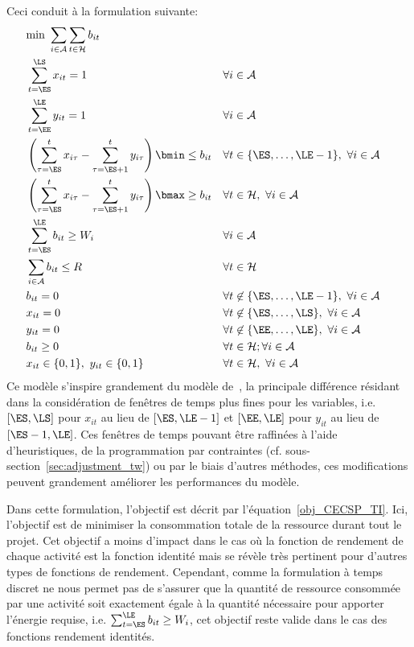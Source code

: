 Ceci conduit à la formulation suivante:
{\small
 \begin{align} &\text{min }
\sum_{i\in \A}\sum_{t \in \H} b_{it}
\label{obj_CECSP_TI}\\ &\sum_{t=\ES}^{\LS} x_{it} = 1 & &\forall i
\in \A \label{start_CECSP_TI}\\ &\sum_{t=\EE}^{\LE} y_{it} =
1 & & \forall i \in \A
\label{end_CECSP_TI}\\&\left(\sum_{\tau=\ES}^{t} x_{i\tau}
-\sum_{\tau=\ES+1}^{t} y_{i\tau}\right)\bmin \le b_{it} & &
\forall t \in \{\ES,\dots,\LE-1\},\ \forall i \in \A
\label{bmin_CECSP_TI}\\ &\left(\sum_{\tau=\ES}^{t} x_{i\tau} -
\sum_{\tau=\ES+1}^{t} y_{i\tau}\right)\bmax\ge b_{it}& & \forall t
\in \H ,\ \forall i \in \A \label{bmax_CECSP_TI}\\
&\sum_{t=\ES}^{\LE} b_{it} \ge W_i & & \forall i \in \A
\label{nrj_CECSP_TI}\\ &\sum_{i \in \A} b_{it} \le R & &
\forall t \in \H \label{res_CECSP_TI}\\ &b_{it} = 0 & &
\forall t \not\in \{\ES,\dots,\LE-1\},\ \forall i \in \A
\label{consNul_CECSP_TI}\\ &x_{it} = 0 & & \forall t \not\in
\{\ES,\dots,\LS\},\ \forall i \in \A \label{twx_CECSP_TI}\\
&y_{it} = 0 & & \forall t \not\in \{\EE,\dots,\LE\},\ \forall i
\in \A \label{twy_CECSP_TI}\\ & b_{it} \ge 0 & & \forall t
\in \H; \forall i \in \A \label{Bb_CECSP_TI}\\
&x_{it}\in \{0,1\},\ y_{it} \in \{0,1\} & & \forall t \in {\cal
H},\ \forall i \in \A \label{Bxy_CECSP_TI} \end{align}
} 
Ce modèle s'inspire grandement du modèle de~\cite{ALR}, la principale
différence résidant dans la considération de fenêtres de temps plus
fines pour les variables, i.e. $[\ES,\LS]$ pour $x_{it}$ au lieu de
$[\ES,\LE-1]$ et $[\EE,\LE]$ pour $y_{it}$ au lieu de
$[\ES-1,\LE]$. Ces fenêtres de temps pouvant être raffinées à l'aide
d'heuristiques, de la programmation par contraintes (cf.
sous-section~\ref{sec:adjustment_tw}) ou par le biais d'autres méthodes,
ces modifications peuvent grandement améliorer les performances du
modèle.

Dans cette formulation, l'objectif est décrit par
l'équation~\eqref{obj_CECSP_TI}. Ici, l'objectif est de minimiser la
consommation totale de la ressource durant tout le projet. Cet
objectif a moins d'impact dans le cas où la fonction de rendement de
chaque activité est la fonction identité mais se révèle très pertinent
pour d'autres types de fonctions de rendement.  Cependant, comme la
formulation à temps discret ne nous permet pas de s'assurer que la
quantité de ressource consommée par une activité soit exactement égale
à la quantité nécessaire pour apporter l'énergie requise,
i.e. $\sum_{t=\ES}^{\LE} b_{it} \ge W_i$, cet objectif reste valide
dans le cas des fonctions rendement identités.

